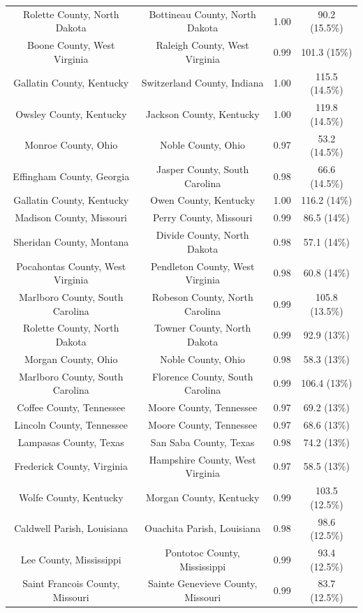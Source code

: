 \begin{longtable}{cccc}
  Rolette County, North Dakota & Bottineau County, North Dakota & 1.00 & 90.2 (15.5\%) \\ 
  Boone County, West Virginia & Raleigh County, West Virginia & 0.99 & 101.3 (15\%) \\ 
  Gallatin County, Kentucky & Switzerland County, Indiana & 1.00 & 115.5 (14.5\%) \\ 
  Owsley County, Kentucky & Jackson County, Kentucky & 1.00 & 119.8 (14.5\%) \\ 
  Monroe County, Ohio & Noble County, Ohio & 0.97 & 53.2 (14.5\%) \\ 
  Effingham County, Georgia & Jasper County, South Carolina & 0.98 & 66.6 (14.5\%) \\ 
  Gallatin County, Kentucky & Owen County, Kentucky & 1.00 & 116.2 (14\%) \\ 
  Madison County, Missouri & Perry County, Missouri & 0.99 & 86.5 (14\%) \\ 
  Sheridan County, Montana & Divide County, North Dakota & 0.98 & 57.1 (14\%) \\ 
  Pocahontas County, West Virginia & Pendleton County, West Virginia & 0.98 & 60.8 (14\%) \\ 
  Marlboro County, South Carolina & Robeson County, North Carolina & 0.99 & 105.8 (13.5\%) \\ 
  Rolette County, North Dakota & Towner County, North Dakota & 0.99 & 92.9 (13\%) \\ 
  Morgan County, Ohio & Noble County, Ohio & 0.98 & 58.3 (13\%) \\ 
  Marlboro County, South Carolina & Florence County, South Carolina & 0.99 & 106.4 (13\%) \\ 
  Coffee County, Tennessee & Moore County, Tennessee & 0.97 & 69.2 (13\%) \\ 
  Lincoln County, Tennessee & Moore County, Tennessee & 0.97 & 68.6 (13\%) \\ 
  Lampasas County, Texas & San Saba County, Texas & 0.98 & 74.2 (13\%) \\ 
  Frederick County, Virginia & Hampshire County, West Virginia & 0.97 & 58.5 (13\%) \\ 
  Wolfe County, Kentucky & Morgan County, Kentucky & 0.99 & 103.5 (12.5\%) \\ 
  Caldwell Parish, Louisiana & Ouachita Parish, Louisiana & 0.98 & 98.6 (12.5\%) \\ 
  Lee County, Mississippi & Pontotoc County, Mississippi & 0.99 & 93.4 (12.5\%) \\ 
  Saint Francois County, Missouri & Sainte Genevieve County, Missouri & 0.99 & 83.7 (12.5\%) \\ 

\end{longtable}
